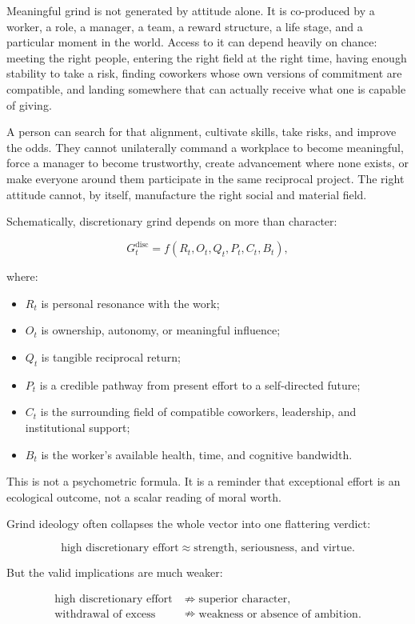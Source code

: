 \documentclass[11pt,oneside]{article}
\providecommand{\tightlist}{%
  \setlength{\itemsep}{0.22em}\setlength{\parskip}{0pt}}
\begin{document}
Meaningful grind is not generated by attitude alone. It is co-produced
by a worker, a role, a manager, a team, a reward structure, a life
stage, and a particular moment in the world. Access to it can depend
heavily on chance: meeting the right people, entering the right field at
the right time, having enough stability to take a risk, finding
coworkers whose own versions of commitment are compatible, and landing
somewhere that can actually receive what one is capable of giving.

A person can search for that alignment, cultivate skills, take risks,
and improve the odds. They cannot unilaterally command a workplace to
become meaningful, force a manager to become trustworthy, create
advancement where none exists, or make everyone around them participate
in the same reciprocal project. The right attitude cannot, by itself,
manufacture the right social and material field.

Schematically, discretionary grind depends on more than character:

\[
G_t^{\mathrm{disc}}
=
f(R_t,O_t,Q_t,P_t,C_t,B_t),
\]

where:

\begin{itemize}
\tightlist
\item
  \(R_t\) is personal resonance with the work;
\item
  \(O_t\) is ownership, autonomy, or meaningful influence;
\item
  \(Q_t\) is tangible reciprocal return;
\item
  \(P_t\) is a credible pathway from present effort to a self-directed
  future;
\item
  \(C_t\) is the surrounding field of compatible coworkers, leadership,
  and institutional support;
\item
  \(B_t\) is the worker's available health, time, and cognitive
  bandwidth.
\end{itemize}

This is not a psychometric formula. It is a reminder that exceptional
effort is an ecological outcome, not a scalar reading of moral worth.

Grind ideology often collapses the whole vector into one flattering
verdict:

\[
\text{high discretionary effort}
\approx
\text{strength, seriousness, and virtue}.
\]

But the valid implications are much weaker:

\[
\begin{aligned}
\text{high discretionary effort}
&\nRightarrow
\text{superior character},\\
\text{withdrawal of excess}
&\nRightarrow
\text{weakness or absence of ambition}.
\end{aligned}
\]
\end{document}
